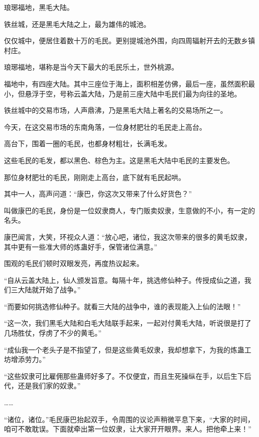 
\begin{this_body}



琅琊福地，黑毛大陆。

铁丝城，还是黑毛大陆之上，最为雄伟的城池。

仅仅城中，便居住着数十万的毛民。更别提城池外围，向四周辐射开去的无数乡镇村庄。

琅琊福地，堪称是当今天下最大的毛民乐土，世外桃源。

福地中，有四座大陆。其中三座位于海上，面积相差仿佛，最后一座，虽然面积最小，但悬浮于空，号称云盖大陆，乃是前三座大陆中毛民们最为向往的圣地。

铁丝城中的交易市场，人声鼎沸，乃是黑毛大陆上著名的交易场所之一。

今天，在这交易市场的东南角落，一位身材肥壮的毛民走上高台。

高台下，围着一圈的毛民，也都身材粗壮，长满毛发。

这些毛民的毛发，都以黑色、棕色为主。这是黑毛大陆中毛民的主要发色。

那位身材肥壮的毛民，刚刚走上高台，底下就有毛民起哄。

其中一人，高声问道：“康巴，你这次又带来了什么好货色？”

叫做康巴的毛民，身份是一位奴隶商人，专门贩卖奴隶，生意做的不小，有一定的名头。

康巴闻言，大笑，环视众人道：“放心吧，诸位，我这次带来的很多的黄毛奴隶，其中更有一些准大师的炼蛊好手，保管诸位满意。”

围观的毛民们顿时双眼发亮，再度热议起来。

“自从云盖大陆上，仙人颁发旨意。每隔十年，挑选修仙种子。传授成仙之道，我们三大陆就开始了战争。”

“而要如何挑选修仙种子。就看三大陆的战争中，谁的表现能入上仙的法眼！”

“这一次，我们黑毛大陆和白毛大陆联手起来，一起对付黄毛大陆，听说很是打了几场胜仗，俘虏了不少的黄毛。”

“成仙我一个老头子是不指望了，但是这些黄毛奴隶，我却想拿下，为我的炼蛊工坊增添劳力。”

“这些奴隶可比雇佣那些蛊师好多了。不仅便宜，而且生死操纵在手，以后生下后代，还是我们家的奴隶。”

……

“诸位，诸位。”毛民康巴抬起双手，令周围的议论声稍微平息下来，“大家的时间，咱可不敢耽误。下面就牵出第一位奴隶，让大家开开眼界。来人。把他牵上来！”


\end{this_body}

